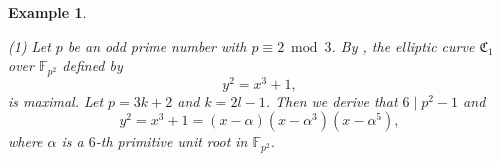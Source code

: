\documentclass[journal,12pt,onecolumn]{IEEEtran}
\newtheorem{example}[theorem]{Example}
\begin{document}
\begin{example}\label{LCP_EC_ex}

    {\rm (1)} Let $p$ be an odd prime number with $p\equiv 2 \bmod 3$. By \cite[Lem. 17]{Optimal_Locally_Repairable_Codes_Via_Elliptic_Curves}, the elliptic curve $\mathfrak{C}_1$ over $\mathbb{F}_{p^2}$ defined by 
    \[
        y^2 = x^3+1,
    \]
    is maximal. Let $p = 3k+2$ and $k = 2l-1$. Then we derive that $6\mid p^2-1$ and
    \[
        y^2 = x^3+1 = (x-\alpha)(x-\alpha^3)(x-\alpha^5),
    \]
    where $\alpha$ is a $6$-th primitive unit root in $\mathbb{F}_{p^2}$. 
    

\end{example}
\end{document}
